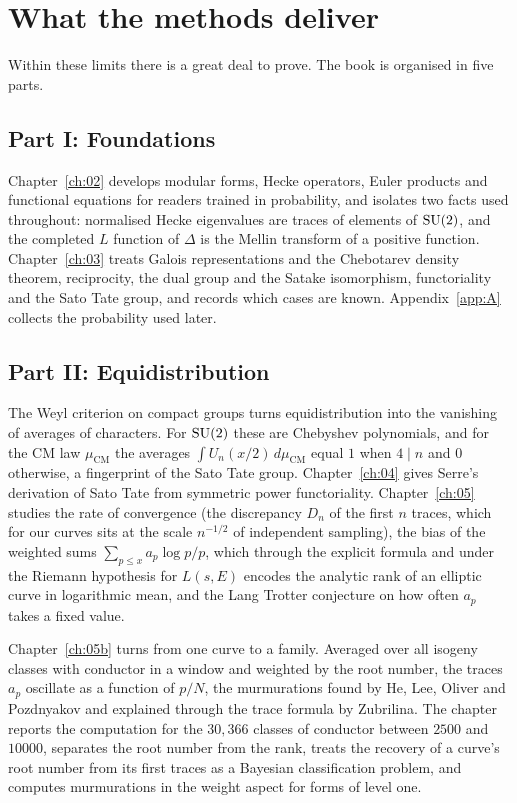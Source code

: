 \section{What the methods deliver}

Within these limits there is a great deal to prove. The book is organised in five parts.

\subsection{Part I: Foundations}
Chapter~\ref{ch:02} develops modular forms, Hecke operators, Euler products and functional equations for readers trained in probability, and isolates two facts used throughout: normalised Hecke eigenvalues are traces of elements of $\mathrm{SU}(2)$, and the completed $L$ function of $\Delta$ is the Mellin transform of a positive function. Chapter~\ref{ch:03} treats Galois representations and the Chebotarev density theorem, reciprocity, the dual group and the Satake isomorphism, functoriality and the Sato Tate group, and records which cases are known. Appendix~\ref{app:A} collects the probability used later.

\subsection{Part II: Equidistribution}
The Weyl criterion on compact groups turns equidistribution into the vanishing of averages of characters. For $\mathrm{SU}(2)$ these are Chebyshev polynomials, and for the CM law $\mu_{\mathrm{CM}}$ the averages $\int U_n(x/2)\,d\mu_{\mathrm{CM}}$ equal $1$ when $4\mid n$ and $0$ otherwise, a fingerprint of the Sato Tate group. Chapter~\ref{ch:04} gives Serre's derivation of Sato Tate from symmetric power functoriality. Chapter~\ref{ch:05} studies the rate of convergence (the discrepancy $D_n$ of the first $n$ traces, which for our curves sits at the scale $n^{-1/2}$ of independent sampling), the bias of the weighted sums $\sum_{p\le x}a_p\log p/p$, which through the explicit formula and under the Riemann hypothesis for $L(s,E)$ encodes the analytic rank of an elliptic curve in logarithmic mean, and the Lang Trotter conjecture on how often $a_p$ takes a fixed value.

Chapter~\ref{ch:05b} turns from one curve to a family. Averaged over all isogeny classes with conductor in a window and weighted by the root number, the traces $a_p$ oscillate as a function of $p/N$, the murmurations found by He, Lee, Oliver and Pozdnyakov and explained through the trace formula by Zubrilina. The chapter reports the computation for the $30{,}366$ classes of conductor between $2500$ and $10000$, separates the root number from the rank, treats the recovery of a curve's root number from its first traces as a Bayesian classification problem, and computes murmurations in the weight aspect for forms of level one.

